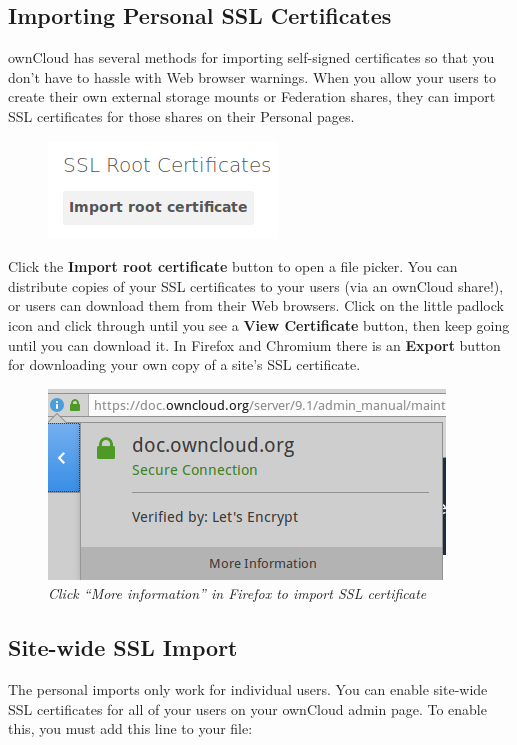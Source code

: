 \documentclass[letterpaper,10pt,english]{sphinxmanual}
\begin{document}
\subsection{Importing Personal SSL Certificates}
\label{configuration_server/import_ssl_cert:importing-personal-ssl-certificates}
ownCloud has several methods for importing self-signed certificates so that you don't have to hassle with Web browser warnings. When you allow your users to create their own external storage mounts or Federation shares, they can import SSL certificates for those shares on their Personal pages.
\begin{figure}[htbp]
\centering

\includegraphics{import-ssl-cert-1.png}
\end{figure}

Click the \textbf{Import root certificate} button to open a file picker. You can distribute copies of your SSL certificates to your users (via an ownCloud share!), or users can download them from their Web browsers. Click on the little padlock icon and click through until you see a \textbf{View Certificate} button, then keep going until you can download it. In Firefox and Chromium there is an \textbf{Export} button for downloading your own copy of a site's SSL certificate.
\begin{figure}[htbp]
\centering
\capstart

\includegraphics{import-ssl-cert-2.png}
\caption{\emph{Click ``More information'' in Firefox to import SSL certificate}}\end{figure}


\subsection{Site-wide SSL Import}
\label{configuration_server/import_ssl_cert:site-wide-ssl-import}
The personal imports only work for individual users. You can enable site-wide SSL certificates for all of your users on your ownCloud admin page. To enable this, you must add this line to your  file:
\end{document}
